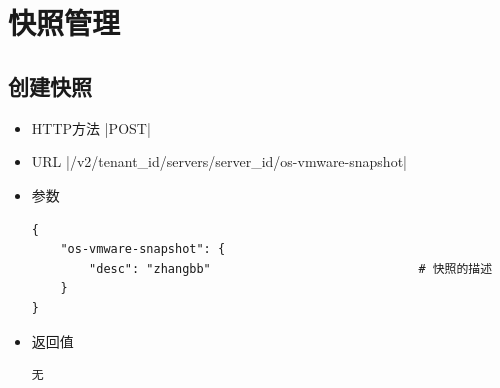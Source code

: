 \documentclass[oneside]{book}
\begin{document}
\begin{titlepage}
	\\
	\vspace{\fill}
	\\
	\vspace{80mm}
\end{titlepage}

\newpage
\frontmatter
{
  \renewcommand*\contentsname{目录}
  \tableofcontents%
  \thispagestyle{empty}
}

\mainmatter

\chapter{快照管理}
\section{创建快照}
\begin{itemize}
\item HTTP方法
|POST|
\item URL
|/v2/{tenant_id}/servers/{server_id}/os-vmware-snapshot|
\item 参数
\begin{verbatim}
{
    "os-vmware-snapshot": {
        "desc": "zhangbb"                             # 快照的描述
    }
}
\end{verbatim}
\item 返回值
\begin{verbatim}
无
\end{verbatim}
\end{itemize}
\end{document}
